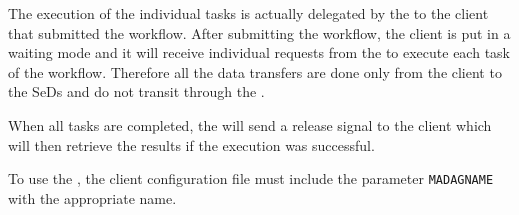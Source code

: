 The execution of the individual tasks is actually delegated by the
\madag to the client that submitted the workflow. After submitting
the workflow, the client is put in a waiting mode and it will
receive individual requests from the \madag to execute each task
of the workflow. Therefore all the data transfers are done only
from the client to the SeDs and do not transit through the \madag.

When all tasks are completed, the \madag will send a release signal
to the client which will then retrieve the results if the execution
was successful.

To use the \madag, the client configuration file must include
the parameter \texttt{MADAGNAME} with the appropriate name.

%
%
%
%
%
